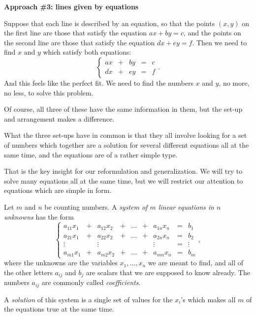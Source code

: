 \documentclass[00-livre-main.tex]{subfiles}
\begin{document}
\noindent\textbf{Approach \#3: lines given by equations}

Suppose that each line is described by an equation, so that the points $(x,y)$ on the first line are those that satisfy the equation $ax+by=c$, and the points on the second line are those that satisfy the equation $dx+ey = f$. Then we need to find $x$ and $y$ which satisfy both equations:
\[
\left\{ \begin{array}{ccccc}
ax & + & by & = & c \\
dx & + & ey & = & f
\end{array}\right. .
\]
And this feels like the perfect fit. We need to find the numbers $x$ and $y$, no more, no less, to solve this problem.

Of course, all three of these have the same information in them, but the set-up and arrangement makes a difference.

What the three set-ups have in common is that they all involve looking for a set of numbers which together are a solution for several different equations all at the same time, and the equations are of a rather simple type. 

That is the key insight for our reformulation and generalization. We will try to solve many equations all at the same time, but we will restrict our attention to equations which are simple in form.


\begin{definition}
Let $m$ and $n$ be counting numbers. A \emph{system of $m$ linear equations in $n$ unknowns} has the form
\[
\left\{\begin{array}{rrrrrrrrr}
a_{11} x_1 & + & a_{12} x_2 & + & \dots & + & a_{1n} x_n & = & b_1 \\
a_{21} x_1 & + & a_{22} x_2 & + & \dots & + & a_{2n} x_n & = & b_2 \\
\vdots & & \vdots & & & & \vdots & = & \vdots \\
a_{m1} x_1 & + & a_{m2} x_2 & + & \dots & + & a_{mn} x_n & = & b_m 
\end{array}\right. ,
\]
where the unknowns are the variables $x_1, \ldots, x_n$ we are meant to find, and
all of the other letters $a_{ij}$ and $b_j$ are scalars that we are supposed to know already. The numbers $a_{ij}$ are commonly called \emph{coefficients}.

A \emph{solution} of this system is a single set of values for the $x_i$'s which makes 
all $m$ of the equations true at the same time.
\end{definition}
\end{document}
